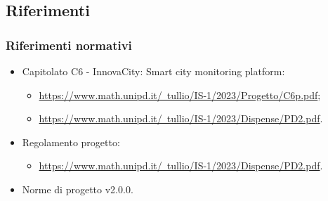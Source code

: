 \subsection{Riferimenti}
\subsubsection{Riferimenti normativi}
\begin{itemize}
    \item Capitolato C6 - InnovaCity: Smart city monitoring platform:
    \begin{itemize}
        \item \href{https://www.math.unipd.it/~tullio/IS-1/2023/Progetto/C6.pdf}{https://www.math.unipd.it/~tullio/IS-1/2023/Progetto/C6p.pdf};
        \item \href{https://www.math.unipd.it/~tullio/IS-1/2023/Dispense/PD2.pdf}{https://www.math.unipd.it/~tullio/IS-1/2023/Dispense/PD2.pdf}.
    \end{itemize}
    \item Regolamento progetto:
    \begin{itemize}
        \item \href{https://www.math.unipd.it/~tullio/IS-1/2023/Dispense/PD2.pdf}{https://www.math.unipd.it/~tullio/IS-1/2023/Dispense/PD2.pdf}.
    \end{itemize}
    \item Norme di progetto v2.0.0.
    
\end{itemize}
